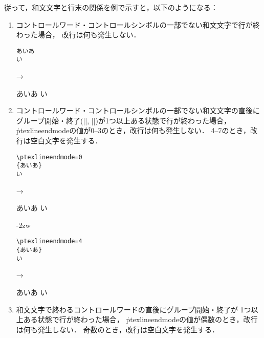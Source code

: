 \documentclass[a4paper,11pt,nomag,dvipdfmx]{jsarticle}
\begin{document}
\begin{dangerous}
  従って，和文文字と行末の関係を例で示すと，以下のようになる：
  \medskip

  \begin{enumerate}
    \itemsep\medskipamount
    \item コントロールワード・コントロールシンボルの一部でない和文文字で行が終わった場合，
    改行は何も発生しない．

    \medskip
    \begin{minipage}[t]{13zw}
\begin{verbatim}
あいあ
い
\end{verbatim}
    \end{minipage}\quad →\quad
    \begin{minipage}[t]{5zw}
あいあ
い
    \end{minipage}%

    \item コントロールワード・コントロールシンボルの一部でない和文文字の直後に
    グループ開始・終了(|{|, |}|)が1つ以上ある状態で行が終わった場合，
    \.{ptexlineendmode}の値が0--3のとき，改行は何も発生しない．
    4--7のとき，改行は空白文字を発生する．

    \medskip
    \begin{minipage}[t]{13zw}
\begin{verbatim}
\ptexlineendmode=0
{あいあ}
い
\end{verbatim}
    \end{minipage}\quad →\quad
    \begin{minipage}[t]{5zw}
{あいあ}
い
    \end{minipage}%
    \hfill\vrule\hfill\kern-2zw
    \begin{minipage}[t]{13zw}
\begin{verbatim}
\ptexlineendmode=4
{あいあ}
い
\end{verbatim}
    \end{minipage}\quad →\quad
    \begin{minipage}[t]{5zw}
{あいあ}
い
    \end{minipage}
    \item 和文文字で終わるコントロールワードの直後にグループ開始・終了が
    1つ以上ある状態で行が終わった場合，
    \.{ptexlineendmode}の値が偶数のとき，改行は何も発生しない．
    奇数のとき，改行は空白文字を発生する．


\end{enumerate}
\end{dangerous}
\end{document}

